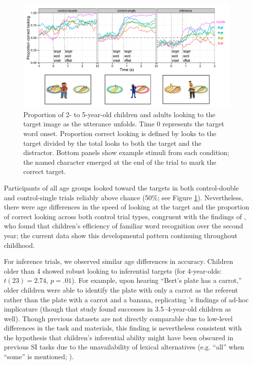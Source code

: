 \documentclass[10pt,letterpaper]{article}
\begin{document}
\begin{figure}[t]
  \includegraphics[width=\textwidth]{figures/140521-simpimp_age-edit.pdf}
  \caption{\label{fig:age} Proportion of 2- to 5-year-old children and adults looking to the target image as the utterance unfolds. Time 0 represents the target word onset. Proportion correct looking is defined by looks to the target divided by the total looks to both the target and the distractor. Bottom panels show example stimuli from each condition; the named character emerged at the end of the trial to mark the correct target.}
\end{figure}


Participants of all age groups looked toward the targets in both control-double and control-single trials reliably above chance (50\%; see Figure \ref{fig:age}). Nevertheless, there were age differences in the speed of looking at the target and the proportion of correct looking across both control trial types, congruent with the findings of , who found that children's efficiency of familiar word recognition over the second year; the current data show this developmental pattern continuing throughout childhood. 

For inference trials, we observed similar age differences in accuracy. Children older than 4 showed robust looking to inferential targets (for 4-year-olds: $t(23) = 2.74$, $p =.01$). For example, upon hearing ``Bert's plate has a carrot,'' older children were able to identify the plate with only a carrot as the referent rather than the plate with a carrot and a banana, replicating 's findings of ad-hoc implicature (though that study found successes in 3.5--4-year-old children as well). Though previous datasets are not directly comparable due to low-level differences in the task and materials, this finding is nevertheless consistent with the hypothesis that children's inferential ability might have been obscured in previous SI tasks due to the unavailability of lexical alternatives (e.g. ``all'' when ``some'' is mentioned; ).
\end{document}
